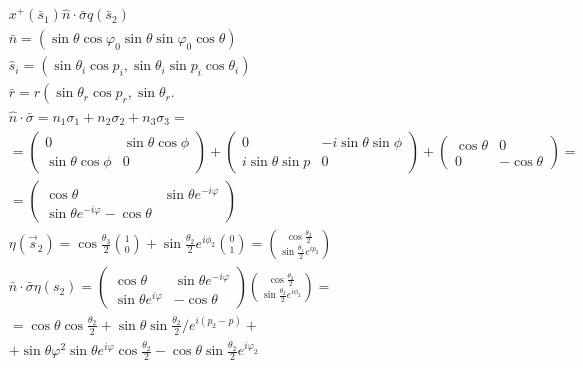 \documentclass[10pt]{article}
\begin{document}
\[
\begin{aligned}
& x^{+}\left(\bar{s}_{1}\right) \hat{n} \cdot \bar{\sigma} q\left(\bar{s}_{2}\right) \\
& \bar{n}=\left(\sin \theta \cos \varphi_{0} \sin \theta \sin \varphi_{0} \cos \theta\right) \\
& \hat{s}_{i}=\left(\sin \theta_{i} \cos p_{i}, \sin \theta_{i} \sin p_{i} \cos \theta_{i}\right) \\
& \bar{r}=r\left(\sin \theta_{r} \cos p_{r}, \sin \theta_{r}\right. \text {. } \\
& \hat{n} \cdot \bar{\sigma}=n_{1} \sigma_{1}+n_{2} \sigma_{2}+n_{3} \sigma_{3}= \\
& =\left(\begin{array}{cc}
0 & \sin \theta \cos \phi \\
\sin \theta \cos \phi & 0
\end{array}\right)+\left(\begin{array}{cc}
0 & -i \sin \theta \sin \phi \\
i \sin \theta \sin p & 0
\end{array}\right)+\left(\begin{array}{cc}
\cos \theta & 0 \\
0 & -\cos \theta
\end{array}\right)= \\
& =\left(\begin{array}{cc}
\cos \theta & \sin \theta e^{-i \varphi} \\
\sin \theta e^{-i \varphi}-\cos \theta
\end{array}\right) \\
& \eta\left(\vec{s}_{2}\right)=\cos \frac{\theta_{3}}{2}\binom{1}{0}+\sin \frac{\theta_{2}}{2} e^{i \phi_{2}}\binom{0}{1}=\binom{\cos \frac{\theta_{3}}{2}}{\sin \frac{\theta_{1}}{2} e^{i p_{2}}} \\
& \bar{n} \cdot \bar{\sigma} \eta\left(s_{2}\right)=\left(\begin{array}{cc}
\cos \theta & \sin \theta e^{-i \varphi} \\
\sin \theta e^{i \varphi} & -\cos \theta
\end{array}\right)\binom{\cos \frac{\theta_{2}}{2}}{\sin \frac{\theta_{2}}{2} e^{i \phi_{2}}}= \\
& =\cos \theta \cos \frac{\theta_{2}}{2}+\sin \theta \sin \frac{\theta_{2}}{2} / e^{i\left(p_{2}-p\right)}+ \\
& +\sin \theta \varphi^{2} \sin \theta e^{i \varphi} \cos \frac{\theta_{2}}{2}-\cos \theta \sin \frac{\theta_{2}}{2} e^{i \varphi_{2}} \\

\end{aligned}\]
\end{document}
